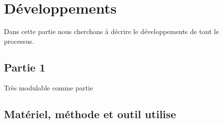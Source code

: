 \chapter{Développements}

Dans cette partie nous cherchons à décrire le développements de tout le processus.

\section{Partie 1}

Très modulable comme partie

\section{Matériel, méthode et outil utilise}